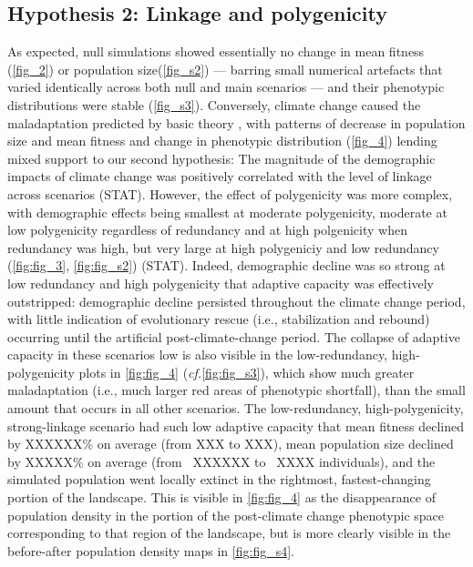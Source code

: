 \documentclass[9pt,twocolumn,twoside,lineno]{pnas-new}
\begin{document}
\subsection{Hypothesis 2: Linkage and polygenicity}
As expected, null simulations showed essentially no change in mean fitness (\ref{fig_2}) or population size(\ref{fig_s2}) --- barring small
numerical artefacts that varied identically across both
null and main scenarios --- and their phenotypic distributions were
stable (\ref{fig_s3}).
Conversely, climate change caused the maladaptation
predicted by basic theory \cite{aitken_whitlock},
with patterns of decrease in population size and mean fitness
and change in phenotypic distribution (\ref{fig_4})
lending mixed support to our second hypothesis:
The magnitude of the demographic impacts of climate change was positively
correlated with the level of linkage across scenarios (STAT).
However, the effect of polygenicity
was more complex, with demographic effects being smallest at moderate polygenicity,
moderate at low polygenicity regardless of redundancy and at high polgenicity when redundancy was high,
but very large at high polygeniciy and low redundancy (\ref{fig:fig_3}, \ref{fig:fig_s2}) (STAT).
Indeed, demographic decline was so strong at low redundancy and high polygenicity
that adaptive capacity was effectively outstripped: demographic decline persisted throughout
the climate change period, with little indication of evolutionary rescue
(i.e., stabilization and rebound) occurring until the artificial post-climate-change period.
The collapse of adaptive capacity in these scenarios
low is also visible in the low-redundancy, high-polygenicity plots in \ref{fig:fig_4}
(\textit{cf.}\ref{fig:fig_s3}),
which show much greater maladaptation (i.e., much larger red areas of phenotypic shortfall),
than the small amount that occurs in all other scenarios.
The low-redundancy, high-polygenicity, strong-linkage scenario had such low adaptive capacity
that mean fitness declined by XXXXXX\% on average (from XXX to XXX),
mean population size declined by XXXXX\% on average (from ~XXXXXX to ~XXXX individuals),
and the simulated population went locally extinct in the rightmost, fastest-changing portion of the landscape.
This is visible in \ref{fig:fig_4} as the disappearance of population density in the portion
of the post-climate change phenotypic space corresponding to that region of the landscape,
but is more clearly visible in the before-after population density maps in \ref{fig:fig_s4}.
\end{document}
